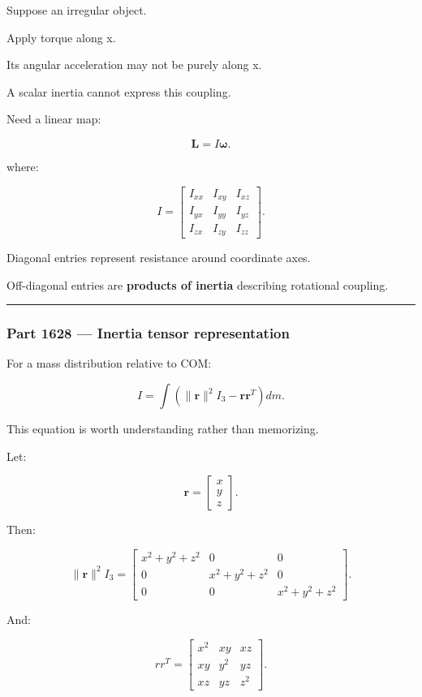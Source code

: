 Suppose an irregular object.

Apply torque along x.

Its angular acceleration may not be purely along x.

A scalar inertia cannot express this coupling.

Need a linear map:

\[
\boxed{
\mathbf{L}
=
I\boldsymbol{\omega}.
}
\]

where:

\[
I=
\begin{bmatrix}
I_{xx}&I_{xy}&I_{xz}\\
I_{yx}&I_{yy}&I_{yz}\\
I_{zx}&I_{zy}&I_{zz}
\end{bmatrix}.
\]

Diagonal entries represent resistance around coordinate axes.

Off-diagonal entries are \textbf{products of inertia} describing rotational coupling.

\begin{center}\rule{0.5\linewidth}{0.5pt}\end{center}

\subsubsection{Part 1628 --- Inertia tensor representation}\label{part-1628-inertia-tensor-representation}

For a mass distribution relative to COM:

\[
\boxed{
I
=
\int
\left(
\|\mathbf{r}\|^2I_3
-
\mathbf{r}\mathbf{r}^T
\right)
dm.
}
\]

This equation is worth understanding rather than memorizing.

Let:

\[
\mathbf{r}
=
\begin{bmatrix}
x\\y\\z
\end{bmatrix}.
\]

Then:

\[
\|\mathbf{r}\|^2I_3
=
\begin{bmatrix}
x^2+y^2+z^2 &0&0\\
0&x^2+y^2+z^2&0\\
0&0&x^2+y^2+z^2
\end{bmatrix}.
\]

And:

\[
rr^T
=
\begin{bmatrix}
x^2&xy&xz\\
xy&y^2&yz\\
xz&yz&z^2
\end{bmatrix}.
\]

